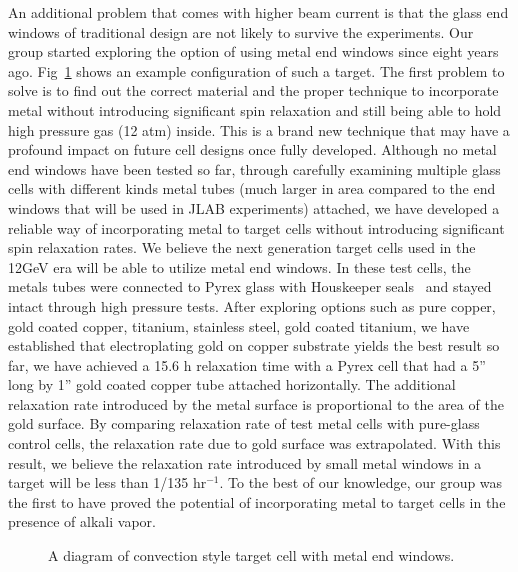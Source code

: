 An additional problem that comes with higher beam current is that the glass end windows of traditional design are not likely to survive the experiments. Our group started exploring the option of using metal end windows since eight years ago. Fig~\ref{metal_end_windows} shows an example configuration of such a target. The first problem to solve is to find out the correct material and the proper technique to incorporate metal without introducing significant spin relaxation and still being able to hold high pressure gas (12 atm) inside. This is a brand new technique that may have a profound impact on future cell designs once fully developed. Although no metal end windows have been tested so far, through carefully examining multiple glass cells with different kinds metal tubes (much larger in area compared to the end windows that will be used in JLAB experiments) attached, we have developed a reliable way of incorporating metal to target cells without introducing significant spin relaxation rates. We believe the next generation target cells used in the 12GeV era will be able to utilize metal end windows. In these test cells, the metals tubes were connected to Pyrex glass with Houskeeper seals~\cite{Houskeeper} and stayed intact through high pressure tests. After exploring options such as pure copper, gold coated copper, titanium, stainless steel, gold coated titanium, we have established that electroplating gold on copper substrate yields the best result so far, we have achieved a 15.6 h relaxation time with a Pyrex cell that had a 5'' long by 1'' gold coated copper tube attached horizontally. The additional relaxation rate introduced by the metal surface is proportional to the area of the gold surface. By comparing relaxation rate of test metal cells with pure-glass control cells, the relaxation rate due to gold surface was extrapolated. With this result, we believe the relaxation rate introduced by small metal windows in a target will be less than 1/135 hr$^{-1}$. To the best of our knowledge, our group was the first to have proved the potential of incorporating metal to target cells in the presence of alkali vapor. 

\begin{figure}[t!]\label{metal_end_windows}
	\centering
	\caption{{A diagram of convection style target cell with metal end windows. }}
\end{figure}

